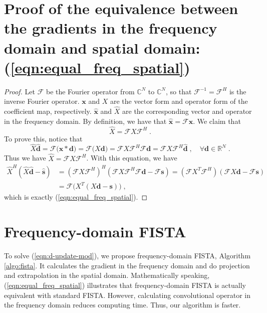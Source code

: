 \documentclass[final]{siamart1116}
\newcommand{\mb}[1]{\mathbf{#1}}
\def \R  {\mathbb{R}}
\def \C  {\mathbb{C}}
\def \F  {\mathcal{F}}
\begin{document}
\section{Proof of the equivalence between the gradients in the frequency domain and spatial domain: (\ref{eqn:equal_freq_spatial}) }
\label{app:equal}

\begin{proof}
Let $\F$ be the Fourier operator from $\C^N$ to $\C^N$, so that $\F^{-1}=\F^H$ is the inverse Fourier operator. $\mb{x}$ and $X$ are the vector form and operator form of the coefficient map, respectively. $\hat{\mb{x}}$ and $\hat{X}$ are the corresponding vector and operator in the frequency domain.
By definition, we have that $\hat{\mb{x}} = \F \mb{x}$.
We claim that
\begin{equation}
\label{eqn:operator-freq}
 \hat{X} = \F X \F^{H} \;.
\end{equation}
 To prove this, notice that
\[\hat{X}\hat{\mb{d}} = \F\big( \mb{x} \ast \mb{d} \big) = \F( X\mb{d} \big) = \F X \F^H \F \mb{d} = \F X \F^H \hat{\mb{d}} \;, \quad \forall \mb{d}\in\R^N \;. \]
Thus we have $\hat{X} = \F X \F^{H}$. With this equation, we have
\[
\begin{aligned}
\hat{X}^H(\hat{X} \hat{\mb{d}} - \hat{\mb{s}}) &= ( \F X \F^{H})^H ( \F X \F^{H} \F\mb{d} - \F\mb{s}) = (\F X^T \F^H) (\F X\mb{d} - \F \mb{s})\\& = \F \big( X^T(X\mb{d}-\mb{s}) \big) \;,
\end{aligned}
\]
which is exactly (\ref{eqn:equal_freq_spatial}).
\end{proof}


\section{Frequency-domain FISTA}
\label{sec:fista_freq}

To solve (\ref{eqn:d-update-mod}), we propose frequency-domain FISTA, Algorithm \ref{algo:fista}. It calculates the gradient in the frequency domain and do projection and extrapolation in the spatial domain. Mathematically speaking, (\ref{eqn:equal_freq_spatial}) illustrates that frequency-domain FISTA is actually equivalent with standard FISTA. However, calculating convolutional operator in the frequency domain reduces computing time. Thus, our algorithm is faster.
\end{document}
